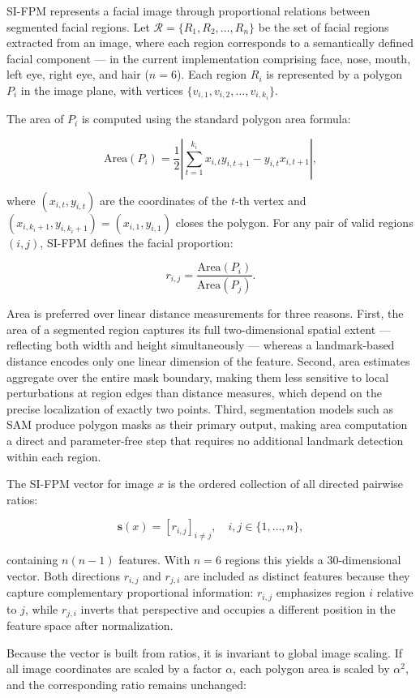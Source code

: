 \documentclass{article}
\begin{document}
SI-FPM represents a facial image through proportional relations between segmented facial regions. Let $\mathcal{R}=\{R_1,R_2,\dots,R_n\}$ be the set of facial regions extracted from an image, where each region corresponds to a semantically defined facial component — in the current implementation comprising face, nose, mouth, left eye, right eye, and hair ($n=6$). Each region $R_i$ is represented by a polygon $P_i$ in the image plane, with vertices $\{v_{i,1},v_{i,2},\dots,v_{i,k_i}\}$.

The area of $P_i$ is computed using the standard polygon area formula:

\[
\text{Area}(P_i)=\frac{1}{2}\left|\sum_{t=1}^{k_i}x_{i,t}y_{i,t+1}-y_{i,t}x_{i,t+1}\right|,
\]

where $(x_{i,t},y_{i,t})$ are the coordinates of the $t$-th vertex and $(x_{i,k_i+1},y_{i,k_i+1})=(x_{i,1},y_{i,1})$ closes the polygon. For any pair of valid regions $(i,j)$, SI-FPM defines the facial proportion:

\[
r_{i,j}=\frac{\text{Area}(P_i)}{\text{Area}(P_j)}.
\]

Area is preferred over linear distance measurements for three reasons. First, the area of a segmented region captures its full two-dimensional spatial extent — reflecting both width and height simultaneously — whereas a landmark-based distance encodes only one linear dimension of the feature. Second, area estimates aggregate over the entire mask boundary, making them less sensitive to local perturbations at region edges than distance measures, which depend on the precise localization of exactly two points. Third, segmentation models such as SAM produce polygon masks as their primary output, making area computation a direct and parameter-free step that requires no additional landmark detection within each region.

The SI-FPM vector for image $x$ is the ordered collection of all directed pairwise ratios:

\[
\mathbf{s}(x)=[r_{i,j}]_{i \neq j}, \quad i,j \in \{1,\dots,n\},
\]

containing $n(n-1)$ features. With $n=6$ regions this yields a 30-dimensional vector. Both directions $r_{i,j}$ and $r_{j,i}$ are included as distinct features because they capture complementary proportional information: $r_{i,j}$ emphasizes region $i$ relative to $j$, while $r_{j,i}$ inverts that perspective and occupies a different position in the feature space after normalization.

Because the vector is built from ratios, it is invariant to global image scaling. If all image coordinates are scaled by a factor $\alpha$, each polygon area is scaled by $\alpha^2$, and the corresponding ratio remains unchanged:
\end{document}
